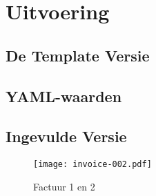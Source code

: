\section{Uitvoering}

\subsection{De Template Versie}
\setlength\fboxsep{0pt}

\subsection{YAML-waarden}

\subsection{Ingevulde Versie}
\begin{figure}[!ht]
    \centering
    \texttt{[image: invoice-002.pdf]}%
    \caption{Factuur 1 en 2}
\end{figure}
